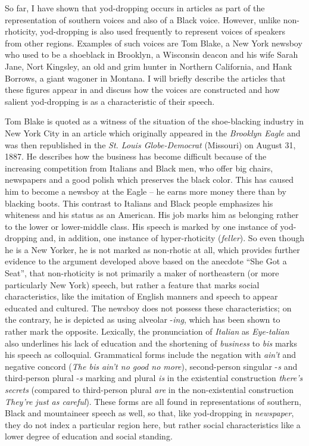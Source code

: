 So far, I have shown that yod-dropping occurs in articles as part of the representation of southern voices and also of a Black voice. However, unlike non-rhoticity, yod-dropping is also used frequently to represent voices of speakers from other regions. Examples of such voices are Tom Blake, a New York newsboy who used to be a shoeblack in Brooklyn, a Wisconsin deacon and his wife Sarah Jane, Nort Kingsley, an old and grim hunter in Northern California, and Hank Borrows, a giant wagoner in Montana. I will briefly describe the articles that these figures appear in and discuss how the voices are constructed and how salient yod-dropping is as a characteristic of their speech.

Tom Blake is quoted as a witness of the situation of the shoe-blacking industry in New York City in an article which originally appeared in the \emph{Brooklyn Eagle} and was then republished in the \emph{St. Louis Globe-Democrat} (Missouri) on August 31, 1887. He describes how the business has become difficult because of the increasing competition from Italians and Black men, who offer big chairs, newspapers and a good polish which preserves the black color. This has caused him to become a newsboy at the Eagle – he earns more money there than by blacking boots. This contrast to Italians and Black people emphasizes his whiteness and his status as an American. His job marks him as belonging rather to the lower or lower-middle class. His speech is marked by one instance of yod-dropping and, in addition, one instance of hyper-rhoticity (\emph{feller}). So even though he is a New Yorker, he is not marked as non-rhotic at all, which provides further evidence to the argument developed above based on the anecdote “She Got a Seat”, that non-rhoticity is not primarily a maker of northeastern (or more particularly New York) speech, but rather a feature that marks social characteristics, like the imitation of English manners and speech to appear educated and cultured. The newsboy does not possess these characteristics; on the contrary, he is depicted as using alveolar -\emph{ing}, which has been shown to rather mark the opposite. Lexically, the pronunciation of \emph{Italian} as \emph{Eye-talian} also underlines his lack of education and the shortening of \emph{business} to \emph{bis} marks his speech as colloquial. Grammatical forms include the negation with \emph{ain’t} and negative concord (\emph{The bis ain’t no good no more}), second-person singular -\emph{s} and third-person plural -\emph{s} marking and plural \emph{is} in the existential construction \emph{there’s secrets} (compared to third-person plural \emph{are} in the non-existential construction \emph{They’re just as careful}). These forms are all found in representations of southern, Black and mountaineer speech as well, so that, like yod-dropping in \emph{newspaper}, they do not index a particular region here, but rather social characteristics like a lower degree of education and social standing.

